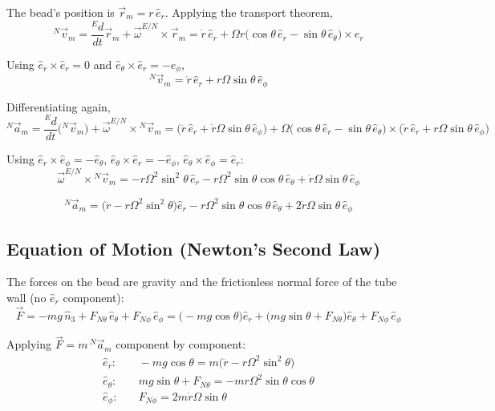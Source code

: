 \documentclass[11pt]{article}
\begin{document}
The bead's position is $\vec r_m = r\,\hat e_r$. Applying the transport theorem,
\[
    {}^{N}\vec v_m = \frac{{}^{E}d}{dt}\vec r_m + \vec\omega^{E/N}\times\vec r_m
    = \dot r\,\hat e_r + \Omega r\big(\cos\theta\,\hat e_r - \sin\theta\,\hat e_\theta\big)\times\hat e_r
\]

Using $\hat e_r\times\hat e_r = 0$ and $\hat e_\theta\times\hat e_r = -\hat e_\phi$,
\[
    {}^{N}\vec v_m = \dot r\,\hat e_r + r\Omega\sin\theta\,\hat e_\phi
\]

Differentiating again,
\[
    {}^{N}\vec a_m = \frac{{}^{E}d}{dt}\big({}^{N}\vec v_m\big) + \vec\omega^{E/N}\times{}^{N}\vec v_m
    = \big(\ddot r\,\hat e_r + \dot r\Omega\sin\theta\,\hat e_\phi\big)
    + \Omega\big(\cos\theta\,\hat e_r - \sin\theta\,\hat e_\theta\big)\times\big(\dot r\,\hat e_r + r\Omega\sin\theta\,\hat e_\phi\big)
\]

Using $\hat e_r\times\hat e_\phi = -\hat e_\theta$, $\hat e_\theta\times\hat e_r = -\hat e_\phi$, $\hat e_\theta\times\hat e_\phi = \hat e_r$:
\[
    \vec\omega^{E/N}\times{}^{N}\vec v_m
    = -r\Omega^{2}\sin^{2}\theta\,\hat e_r - r\Omega^{2}\sin\theta\cos\theta\,\hat e_\theta + \dot r\Omega\sin\theta\,\hat e_\phi
\]

\begin{result}
\[
    {}^{N}\vec a_m =
    \big(\ddot r - r\Omega^{2}\sin^{2}\theta\big)\hat e_r
    - r\Omega^{2}\sin\theta\cos\theta\,\hat e_\theta
    + 2\dot r\Omega\sin\theta\,\hat e_\phi
\]
\end{result}

\subsection*{Equation of Motion (Newton's Second Law)}

The forces on the bead are gravity and the frictionless normal force of the tube wall (no $\hat e_r$ component):
\[
    \vec F = -mg\,\hat n_3 + F_{N\theta}\,\hat e_\theta + F_{N\phi}\,\hat e_\phi
    = \big(-mg\cos\theta\big)\hat e_r + \big(mg\sin\theta + F_{N\theta}\big)\hat e_\theta + F_{N\phi}\,\hat e_\phi
\]

Applying $\vec F = m\,{}^{N}\vec a_m$ component by component:
\begin{align*}
    \hat e_r: &\quad -mg\cos\theta = m\big(\ddot r - r\Omega^{2}\sin^{2}\theta\big) \\
    \hat e_\theta: &\quad mg\sin\theta + F_{N\theta} = -mr\Omega^{2}\sin\theta\cos\theta \\
    \hat e_\phi: &\quad F_{N\phi} = 2m\dot r\Omega\sin\theta
\end{align*}
\end{document}

